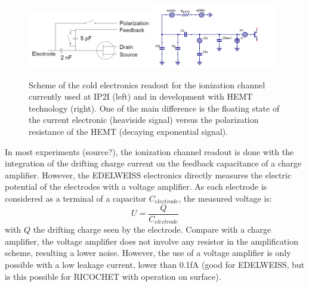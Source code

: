 \begin{figure}
\centering
\includegraphics[width=0.48\textwidth]{Figures/Electrodes/electronic_ion_ip2i.png}
\includegraphics[width=0.48\textwidth]{Figures/Electrodes/electronic_ion_hemt.png}
\caption{Scheme of the cold electronics readout for the ionization channel currently used at IP2I (left) and in development with HEMT technology (right). One of the main difference is the floating state of the current electronic (heaviside signal) versus the polarization resistance of the HEMT (decaying exponential signal).}
\label{fig:electronics-scheme}
\end{figure}

In most experiments (source?), the ionization channel readout is done with the integration of the drifting charge current on the feedback capacitance of a charge amplifier. However, the EDELWEISS electronics directly measures the electric potential of the electrodes with a voltage amplifier. As each electrode is considered as a terminal of a capacitor $C_{electrode}$, the measured voltage is:
\begin{equation}
U = \frac{Q}{C_{electrode}}
\end{equation}
with $Q$ the drifting charge seen by the electrode.
Compare with a charge amplifier, the voltage amplifier does not involve any resistor in the amplification scheme, resulting a lower noise. However, the use of a voltage amplifier is only possible with a low leakage current, lower than 0.1fA (good for EDELWEISS, but is this possible for RICOCHET with operation on surface).

